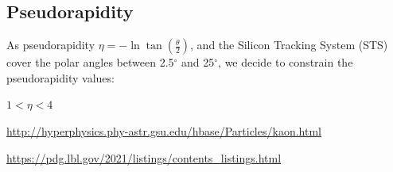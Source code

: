\documentclass[11pt,a4paper]{article}
\begin{document}
\subsection{Pseudorapidity}
As pseudorapidity $\eta = -\ln{\tan(\frac{\theta}{2})}$, and the Silicon Tracking System (STS) cover the polar angles between 2.5$^{\circ}$ and 25$^{\circ}$, we decide to constrain the pseudorapidity values:
\begin{center}
    $ 1< \eta < 4 $
\end{center}

\begin{thebibliography}{9}

\url{http://hyperphysics.phy-astr.gsu.edu/hbase/Particles/kaon.html}

\url{https://pdg.lbl.gov/2021/listings/contents\_listings.html}


\end{thebibliography}
\end{document}
